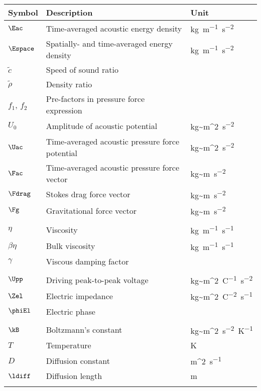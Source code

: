 \begin{center}
\begin{tabular}{p{2cm}p{8cm}p{3cm}}
Symbol						& Description             						& Unit \\ \hline\hline

$\Eac$						& Time-averaged acoustic energy density 		& \SI{kg}{m^{-1}s^{-2}} \\
$\Espace$					& Spatially- and time-averaged energy density 	& \SI{kg}{m^{-1}s^{-2}} \\
$\tilde{c}$					& Speed of sound ratio							& \SI{}{} \\
$\tilde{\rho}$				& Density ratio							        & \SI{}{} \\
$f_1$, $f_2$			  	& Pre-factors in pressure force expression      & \SI{}{} \\
$U_0$						& Amplitude of acoustic potential	      		& \SI{kg~m^2}{s^{-2}} \\
$\Uac$						& Time-averaged acoustic pressure force potential& \SI{kg~m^2}{s^{-2}} \\ 
$\Fac$						& Time-averaged acoustic pressure force vector  & \SI{kg~m}{s^{-2}} \\
$\Fdrag$					& Stokes drag force vector			       		& \SI{kg~m}{s^{-2}} \\
$\Fg$						& Gravitational force vector		       		& \SI{kg~m}{s^{-2}} \\\\

$\eta$		   	  			& Viscosity										& \SI{kg}{m^{-1}s^{-1}} \\
$\beta\eta$		     	  	& Bulk viscosity								& \SI{kg}{m^{-1}s^{-1}} \\
$\gamma$		   			& Viscous damping factor						& \SI{}{} \\\\

$\Upp$		        		& Driving peak-to-peak voltage					& \SI{kg~m^2}{C^{-1}~s^{-2}} \\
$\Zel$		        		& Electric impedance							& \SI{kg~m^2}{C^{-2}~s^{-1}} \\
$\phiEl$		        	& Electric phase								& \SI{}{} \\\\

$\kB$			           	& Boltzmann's constant							& \SI{kg~m^2}{s^{-2}~K^{-1}} \\
$T$			           	  	& Temperature									& K \\
$D$			           		& Diffusion constant							& \SI{m^2}{s^{-1}} \\
$\ldiff$			        & Diffusion length								& \SI{m}{} \\
\\


\end{tabular}
\end{center}
